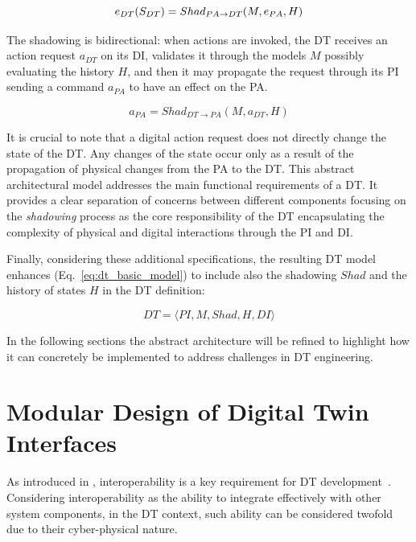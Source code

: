 \begin{equation}
        e_{DT}(S_{DT}) = Shad_{PA \rightarrow DT}(M, e_{PA}, H) \\
\end{equation}

The shadowing is bidirectional:
when actions are invoked, the \ac{DT} receives an action request $a_{DT}$ on its \ac{DI}, validates it through the models $M$ possibly evaluating the history $H$, and then it may propagate the request through its \ac{PI} sending a command $a_{PA}$ to have an effect on the \ac{PA}.

\begin{equation}
    a_{PA} = Shad_{DT \rightarrow PA}(M, a_{DT}, H)
\end{equation}

It is crucial to note that a digital action request does not directly change the state of the \ac{DT}.
Any changes of the state occur only as a result of the propagation of physical changes from the \ac{PA} to the \ac{DT}.
This abstract architectural model addresses the main functional requirements of a \ac{DT}.
It provides a clear separation of concerns between different components focusing on the \emph{shadowing} process as the core responsibility of the \ac{DT} encapsulating the complexity of physical and digital interactions through the \ac{PI} and \ac{DI}. 


Finally, considering these additional specifications, the resulting \ac{DT} model enhances (Eq.~\ref{eq:dt_basic_model}) to include also the shadowing $Shad$ and the history of states $H$ in the \ac{DT} definition:

\begin{equation}\label{eq:5D_dt_model}
    DT = \langle PI, M, Shad, H, DI \rangle
\end{equation}

In the following sections the abstract architecture will be refined to highlight how it can concretely be implemented to address challenges in \ac{DT} engineering.


\section{Modular Design of Digital Twin Interfaces}
\label{sec:dte:engineering-dt:physical-digital-adapters}

As introduced in , interoperability is a key requirement for \ac{DT} development~\cite{Acharya_Khan_Päivärinta_2024,Klar_Arvidsson_Angelakis_2024}.
%
Considering interoperability as the ability to integrate effectively with other system components,
in the \ac{DT} context, such ability can be considered twofold due to their cyber-physical nature.

